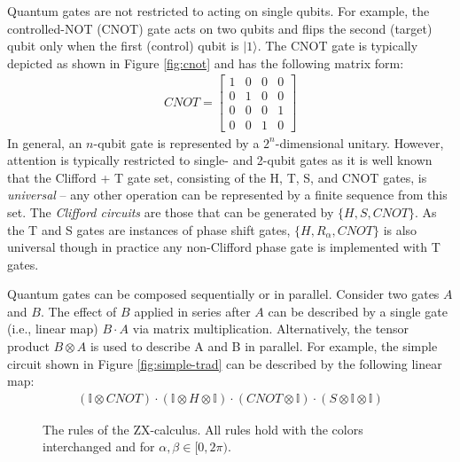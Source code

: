 Quantum gates are not restricted to acting on single qubits.
For example, the controlled-NOT (CNOT) gate acts on two qubits and flips the second (target) qubit only when the first (control) qubit is $|1\rangle$.
The CNOT gate is typically depicted as shown in Figure \ref{fig:cnot} and has the following matrix form:
\begin{align*}
  CNOT = \begin{bmatrix}1 & 0 & 0 & 0 \\0 & 1 & 0 & 0 \\ 0 & 0 & 0 & 1\\0 & 0 & 1 & 0\end{bmatrix}
\end{align*}
In general, an $n$-qubit gate is represented by a $2^n$-dimensional unitary.
However, attention is typically restricted to single- and 2-qubit gates as it is well known that the Clifford + T gate set, consisting of the H, T, S, and CNOT gates, is \emph{universal} -- any other operation can be represented by a finite sequence from this set.
The \emph{Clifford circuits} are those that can be generated by $\{H, S, CNOT\}$.
As the T and S gates are instances of phase shift gates, $\{H, R_{\alpha}, CNOT\}$ is also universal though in practice any non-Clifford phase gate is implemented with T gates. %

Quantum gates can be composed sequentially or in parallel.
Consider two gates $A$ and $B$.
The effect of $B$ applied in series after $A$ can be described by a single gate (i.e., linear map) $B \cdot A$ via matrix multiplication.
Alternatively, the tensor product $B \otimes A$ is used to describe A and B in parallel.
For example, the simple circuit shown in Figure \ref{fig:simple-trad} can be described by the following linear map:
\begin{align*}
  (\mathbb{I} \otimes CNOT) \cdot (\mathbb{I} \otimes H \otimes \mathbb{I}) \cdot (CNOT \otimes \mathbb{I}) \cdot (S \otimes \mathbb{I} \otimes \mathbb{I})
\end{align*}



\begin{figure}
\centering
{}
\caption{
  The rules of the ZX-calculus.
  All rules hold with the colors interchanged and for $\alpha, \beta \in [0, 2 \pi)$.}
\label{fig:zx-rules}
\end{figure}



